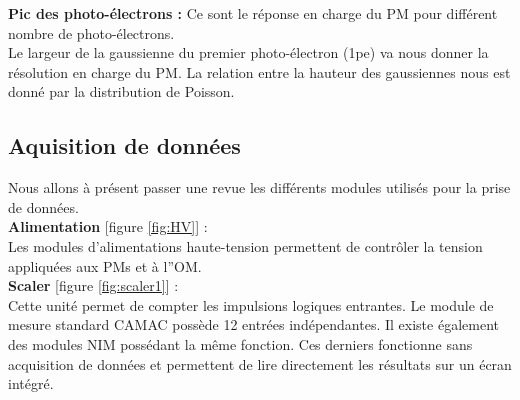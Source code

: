 \textbf{Pic des photo-électrons :} Ce sont le réponse en charge du PM pour différent nombre de photo-électrons.\\

Le largeur de la gaussienne du premier photo-électron (1pe) va nous donner la résolution en charge du PM. La relation entre la hauteur des gaussiennes nous est donné par la distribution de Poisson.

\subsection{Aquisition de donn{\'e}es}

Nous allons à présent passer une revue les différents modules utilisés pour la prise de données. \\

\textbf{Alimentation} [figure \ref{fig:HV}] :\\
Les modules d'alimentations haute-tension permettent de contrôler la tension appliquées aux PMs et à l''OM.\\

\textbf{Scaler} [figure \ref{fig:scaler1}] :\\
Cette unité permet de compter les impulsions logiques entrantes. Le module de mesure standard CAMAC possède 12 entrées indépendantes. Il existe également des modules NIM possédant la même fonction. Ces derniers fonctionne sans acquisition de données et permettent de lire directement les résultats sur un écran intégré.\\


